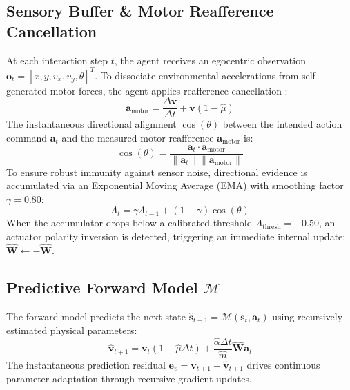 \documentclass[preprint,12pt]{elsarticle}
\begin{document}
\subsection{Sensory Buffer \& Motor Reafference Cancellation}
At each interaction step $t$, the agent receives an egocentric observation $\mathbf{o}_t = [x, y, v_x, v_y, \theta]^T$. To dissociate environmental accelerations from self-generated motor forces, the agent applies reafference cancellation \citep{vonholst1950}:
\begin{equation}
\mathbf{a}_{\text{motor}} = \frac{\Delta \mathbf{v}}{\Delta t} + \mathbf{v}(1 - \hat{\mu})
\end{equation}
The instantaneous directional alignment $\cos(\theta)$ between the intended action command $\mathbf{a}_t$ and the measured motor reafference $\mathbf{a}_{\text{motor}}$ is:
\begin{equation}
\cos(\theta) = \frac{\mathbf{a}_t \cdot \mathbf{a}_{\text{motor}}}{\|\mathbf{a}_t\| \|\mathbf{a}_{\text{motor}}\|}
\end{equation}
To ensure robust immunity against sensor noise, directional evidence is accumulated via an Exponential Moving Average (EMA) with smoothing factor $\gamma = 0.80$:
\begin{equation}
\Lambda_t = \gamma \Lambda_{t-1} + (1 - \gamma) \cos(\theta)
\end{equation}
When the accumulator drops below a calibrated threshold $\Lambda_{\text{thresh}} = -0.50$, an actuator polarity inversion is detected, triggering an immediate internal update: $\hat{\mathbf{W}} \leftarrow -\hat{\mathbf{W}}$.

\subsection{Predictive Forward Model $\mathcal{M}$}
The forward model predicts the next state $\hat{\mathbf{s}}_{t+1} = \mathcal{M}(\mathbf{s}_t, \mathbf{a}_t)$ using recursively estimated physical parameters:
\begin{equation}
\hat{\mathbf{v}}_{t+1} = \mathbf{v}_t (1 - \hat{\mu} \Delta t) + \frac{\hat{\alpha} \Delta t}{\hat{m}} \hat{\mathbf{W}} \mathbf{a}_t
\end{equation}
The instantaneous prediction residual $\mathbf{e}_v = \mathbf{v}_{t+1} - \hat{\mathbf{v}}_{t+1}$ drives continuous parameter adaptation through recursive gradient updates.
\end{document}
